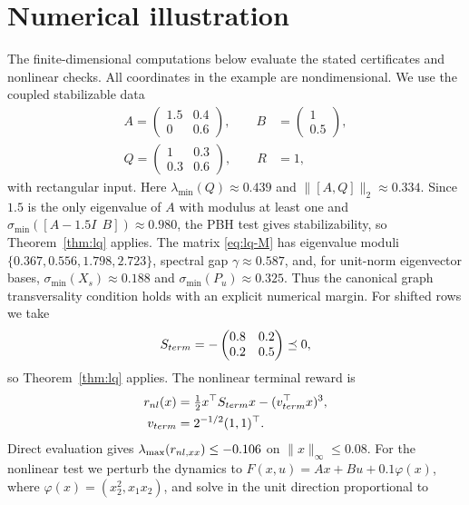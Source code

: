 \documentclass[twocolumn,nameyear,amsthm]{autart}
\newcommand{\Fbar}{F}
\numberwithin{equation}{section}
\begin{document}
\section{Numerical illustration}\label{sec:numerics}
The finite-dimensional computations below evaluate the stated certificates
and nonlinear checks.  All coordinates in the example are nondimensional.
We use the coupled stabilizable data
\begin{equation}\label{eq:num-data}
\begin{aligned}
   A=\begin{pmatrix}1.5&0.4\\0&0.6\end{pmatrix},\qquad
   B&=\begin{pmatrix}1\\0.5\end{pmatrix},\\
   Q=\begin{pmatrix}1&0.3\\0.3&0.6\end{pmatrix},\qquad
   R&=1,
\end{aligned}
\end{equation}
with rectangular input.  Here $\lambda_{\min}(Q)\approx0.439$ and
$\|[A,Q]\|_2\approx0.334$.  Since $1.5$ is the only eigenvalue of $A$ with
modulus at least one and
$\sigma_{\min}([A-1.5I\ \ B])\approx0.980$, the PBH test gives
stabilizability, so Theorem~\ref{thm:lq} applies.  The matrix \eqref{eq:lq-M}
has eigenvalue moduli $\{0.367,0.556,1.798,2.723\}$, spectral gap
$\gamma\approx0.587$, and, for unit-norm eigenvector bases,
$\sigma_{\min}(X_s)\approx0.188$ and $\sigma_{\min}(P_u)\approx0.325$.
Thus the canonical graph transversality condition holds with an explicit
numerical margin.  For shifted
rows we take
\[
   S_{\rm term}=-\begin{pmatrix}0.8&0.2\\0.2&0.5\end{pmatrix}\preceq0,
\]
so Theorem~\ref{thm:lq} applies.  The nonlinear terminal reward is
\[
\begin{aligned}
 r_{\rm nl}(x)&=\tfrac12x^\top S_{\rm term}x
                 -(v_{\rm term}^\top x)^3,\\
 v_{\rm term}&=2^{-1/2}(1,1)^\top .
\end{aligned}
\]
Direct evaluation gives
$\lambda_{\max}(r_{{\rm nl},xx})\le-0.106$ on
$\|x\|_\infty\le0.08$.  For the nonlinear test we perturb the dynamics to
$\Fbar(x,u)=Ax+Bu+0.1\varphi(x)$, where
$\varphi(x)=(x_2^2,x_1x_2)$, and solve in the unit direction proportional to
\end{document}
